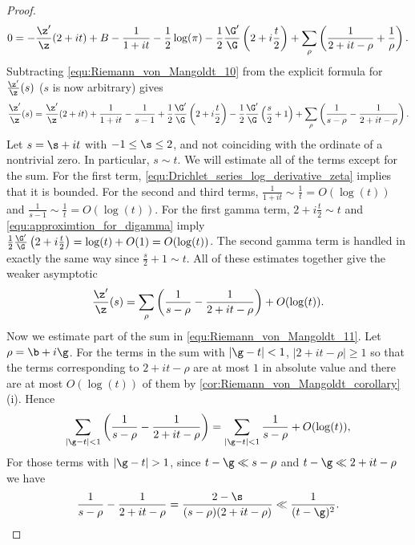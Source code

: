 \begin{proof}
        \begin{equation}\label{equ:Riemann_von_Mangoldt_10}
          0 = -\frac{\z'}{\z}(2+it)+B-\frac{1}{1+it}-\frac{1}{2}\log(\pi)-\frac{1}{2}\frac{\G'}{\G}\left(2+i\frac{t}{2}\right)+\sum_{\rho}\left(\frac{1}{2+it-\rho}+\frac{1}{\rho}\right).
        \end{equation}
        Subtracting \cref{equ:Riemann_von_Mangoldt_10} from the explicit formula for $\frac{\z'}{\z}(s)$ ($s$ is now arbitrary) gives
        \[
          \frac{\z'}{\z}(s) = \frac{\z'}{\z}(2+it)+\frac{1}{1+it}-\frac{1}{s-1}+\frac{1}{2}\frac{\G'}{\G}\left(2+i\frac{t}{2}\right)-\frac{1}{2}\frac{\G'}{\G}\left(\frac{s}{2}+1\right)+\sum_{\rho}\left(\frac{1}{s-\rho}-\frac{1}{2+it-\rho}\right).
        \]
        Let $s = \s+it$ with $-1 \le \s \le 2$, and not coinciding with the ordinate of a nontrivial zero. In particular, $s \sim t$. We will estimate all of the terms except for the sum. For the first term, \cref{equ:Drichlet_series_log_derivative_zeta} implies that it is bounded. For the second and third terms, $\frac{1}{1+it} \sim \frac{1}{t} = O(\log(t))$ and $\frac{1}{s-1} \sim \frac{1}{t} = O(\log(t))$. For the first gamma term, $2+i\frac{t}{2} \sim t$ and \cref{equ:approximtion_for_digamma} imply $\frac{1}{2}\frac{\G'}{\G}\left(2+i\frac{t}{2}\right) = \log(t)+O(1) = O(\log(t))$. The second gamma term is handled in exactly the same way since $\frac{s}{2}+1 \sim t$. All of these estimates together give the weaker asymptotic
        \begin{equation}\label{equ:Riemann_von_Mangoldt_11}
          \frac{\z'}{\z}(s) = \sum_{\rho}\left(\frac{1}{s-\rho}-\frac{1}{2+it-\rho}\right)+O(\log(t)).
        \end{equation}
        Now we estimate part of the sum in \cref{equ:Riemann_von_Mangoldt_11}. Let $\rho = \b+i\g$. For the terms in the sum with $|\g-t| < 1$, $|2+it-\rho| \ge 1$ so that the terms corresponding to $2+it-\rho$ are at most $1$ in absolute value and there are at most $O(\log(t))$ of them by \cref{cor:Riemann_von_Mangoldt_corollary} (i). Hence
        \begin{equation}\label{equ:Riemann_von_Mangoldt_12}
          \sum_{|\g-t| < 1}\left(\frac{1}{s-\rho}-\frac{1}{2+it-\rho}\right) = \sum_{|\g-t| < 1}\frac{1}{s-\rho}+O(\log(t)),
        \end{equation}
        For those terms with $|\g-t| > 1$, since $t-\g \ll s-\rho$ and $t-\g \ll 2+it-\rho$ we have
        \[
          \frac{1}{s-\rho}-\frac{1}{2+it-\rho} = \frac{2-\s}{(s-\rho)(2+it-\rho)} \ll \frac{1}{(t-\g)^{2}}.
\]
\end{proof}
